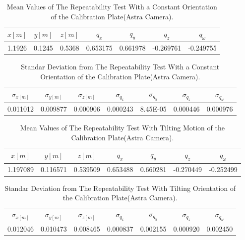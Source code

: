 
\begin{table}[b]
\renewcommand{\arraystretch}{1.3}
\caption{Mean Values of The Repeatability Test With a Constant Orientation of the Calibration Plate(Astra Camera).}
\label{real1}
\centering
\begin{tabular}{|c||c||c||c||c||c||c|}
\hline
$x[m]$ & $y[m]$ & $z[m]$ & $q_{x}$ & $q_{y}$ & $q_{z}$ &$q_{\omega}$ \\
\hline
1.1926 & 0.1245 & 0.5368& 0.653175&	0.661978&	-0.269761&	-0.249755 \\
\hline
\hline
\end{tabular}
\end{table}

\begin{table}[b]
\renewcommand{\arraystretch}{1.3}
\caption{Standar Deviation from The Repeatability Test With a Constant Orientation of the Calibration Plate(Astra Camera).}
\label{real1}
\centering
\begin{tabular}{|c||c||c||c||c||c||c|}
\hline
$\sigma_{x[m]}$ & $\sigma_{y[m]}$ & $\sigma_{z[m]}$ & $\sigma_{q_{x}}$ & $\sigma_{q_{y}}$ & $\sigma_{q_{z}}$ &$\sigma_{q_{\omega}}$ \\
\hline
0.011012&	0.009877	&0.000906&0.000243&	8.45E-05&	0.000446&	0.000976\\
\hline
\hline
\end{tabular}
\end{table}


\begin{table}[b]
\renewcommand{\arraystretch}{1.3}
\caption{Mean Values of The Repeatability Test With Tilting Motion of the Calibration Plate(Astra Camera).}
\label{real1}
\centering
\begin{tabular}{|c||c||c||c||c||c||c|}
\hline
$x[m]$ & $y[m]$ & $z[m]$ & $q_{x}$ & $q_{y}$ & $q_{z}$ &$q_{\omega}$ \\
\hline
1.197089&	0.116571&	0.539509&
0.653488&	0.660281&	-0.270449&	-0.252499 \\
\hline
\hline
\end{tabular}
\end{table}


\begin{table}[b]
\renewcommand{\arraystretch}{1.3}
\caption{Standar Deviation from The Repeatability Test With Tilting Orientation of the Calibration Plate(Astra Camera).}
\label{real1}
\centering
\begin{tabular}{|c||c||c||c||c||c||c|}
\hline
$\sigma_{x[m]}$ & $\sigma_{y[m]}$ & $\sigma_{z[m]}$ & $\sigma_{q_{x}}$ & $\sigma_{q_{y}}$ & $\sigma_{q_{z}}$ &$\sigma_{q_{\omega}}$ \\
0.012046&	0.010473&	0.008465& 0.000837&	0.002155&	0.000920&	0.002450
\\
\hline
\hline
\end{tabular}
\end{table}



